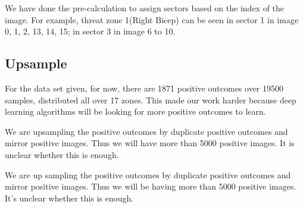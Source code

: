 \documentclass[conference,compsoc]{IEEEtran}
\begin{document}
We have done the pre-calculation to assign sectors based on the index of the image. For example, threat zone 1(Right Bicep) can be seen in sector 1 in image 0, 1, 2, 13, 14, 15; in sector 3 in image 6 to 10.

\subsection{Upsample}
For the data set given, for now, there are 1871 positive outcomes over 19500 samples, distributed all over 17 zones. This made our work harder because deep learning algorithms will be looking for more positive outcomes to learn.

We are upsampling the positive outcomes by duplicate positive outcomes and mirror positive images. Thus we will have more than 5000 positive images. It is unclear whether this is enough.

We are up sampling the positive outcomes by duplicate positive outcomes and mirror positive images. Thus we will be having more than 5000 positive images. It's unclear whether this is enough.
        


\end{document}
